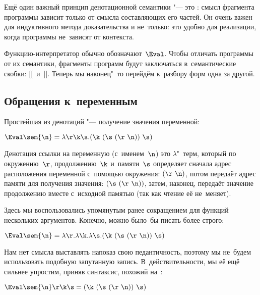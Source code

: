 Ещё один важный принцип денотационной семантики "--- это
: смысл фрагмента программы зависит только от смысла
составляющих его частей. Он очень важен для индуктивного метода доказательства и
не~только: это удобно для реализации, когда программы не~зависят от контекста.

Функцию-интерпретатор обычно обозначают~$\Eval$. Чтобы отличать программы от их
семантики, фрагменты программ будут заключаться в~семантические скобки:
$[\![$~и~$]\!]$. Теперь мы наконец"~то перейдём к~разбору форм одна за другой.


\subsection{Обращения к~переменным}\label{denotational/semantics/ssect:var-ref}

Простейшая из денотаций "--- получение значения переменной:

\begin{denotation}
$\Eval\sem{\n} = \lambda\r\k\s.(\k\ (\s\ (\r\ \n))\ \s)$
\end{denotation}

Денотация ссылки на переменную (с~именем~$\n$) это $\lambda$"~терм, который по
окружению~$\r$, продолжению~$\k$ и~памяти~$\s$ определяет сначала адрес
расположения переменной с~помощью окружения: $(\r\ \n)$, потом передаёт адрес
памяти для получения значения: $(\s\ (\r\ \n))$, затем, наконец, передаёт
значение продолжению вместе с~исходной памятью (так как чтение её не~меняет).

Здесь мы воспользовались упомянутым ранее сокращением для функций нескольких
аргументов. Конечно, можно было~бы писать более строго:

\begin{denotation}
$\Eval\sem{\n} = \lambda\r.\lambda\k.\lambda\s.(\k\ (\s\ (\r\ \n))\ \s)$
\end{denotation}

Нам нет смысла выставлять напоказ свою педантичность, поэтому мы не~будем
использовать подобную запутанную запись. В~действительности, мы её ещё сильнее
упростим, приняв синтаксис, похожий на~:

\begin{denotation}
$\Eval\sem{\n}\r\k\s = (\k\ (\s\ (\r\ \n))\ \s)$
\end{denotation}

